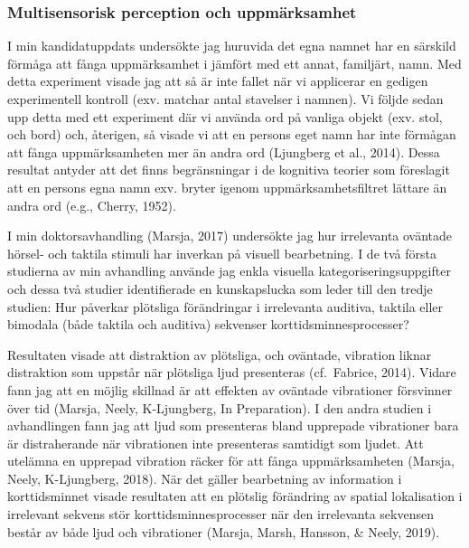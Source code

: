 \documentclass[]{article}
\begin{document}
\hypertarget{multisensorisk-perception-och-uppmuxe4rksamhet}{%
\subsubsection{Multisensorisk perception och
uppmärksamhet}\label{multisensorisk-perception-och-uppmuxe4rksamhet}}

I min kandidatuppdats undersökte jag huruvida det egna namnet har en
särskild förmåga att fånga uppmärksamhet i jämfört med ett annat,
familjärt, namn. Med detta experiment visade jag att så är inte fallet
när vi applicerar en gedigen experimentell kontroll (exv. matchar antal
stavelser i namnen). Vi följde sedan upp detta med ett experiment där vi
använda ord på vanliga objekt (exv. stol, och bord) och, återigen, så
visade vi att en persons eget namn har inte förmågan att fånga
uppmärksamheten mer än andra ord (Ljungberg et al., 2014). Dessa
resultat antyder att det finns begränsningar i de kognitiva teorier som
föreslagit att en persons egna namn exv. bryter igenom
uppmärksamhetsfiltret lättare än andra ord (e.g., Cherry, 1952).

I min doktorsavhandling (Marsja, 2017) undersökte jag hur irrelevanta
oväntade hörsel- och taktila stimuli har inverkan på visuell
bearbetning. I de två första studierna av min avhandling använde jag
enkla visuella kategoriseringsuppgifter och dessa två studier
identifierade en kunskapslucka som leder till den tredje studien: Hur
påverkar plötsliga förändringar i irrelevanta auditiva, taktila eller
bimodala (både taktila och auditiva) sekvenser korttidsminnesprocesser?

Resultaten visade att distraktion av plötsliga, och oväntade, vibration
liknar distraktion som uppstår när plötsliga ljud presenteras
(cf.~Fabrice, 2014). Vidare fann jag att en möjlig skillnad är att
effekten av oväntade vibrationer försvinner över tid (Marsja, Neely,
K-Ljungberg, In Preparation). I den andra studien i avhandlingen fann
jag att ljud som presenteras bland upprepade vibrationer bara är
distraherande när vibrationen inte presenteras samtidigt som ljudet. Att
utelämna en upprepad vibration räcker för att fånga uppmärksamheten
(Marsja, Neely, K-Ljungberg, 2018). När det gäller bearbetning av
information i korttidsminnet visade resultaten att en plötslig
förändring av spatial lokalisation i irrelevant sekvens stör
korttidsminnesprocesser när den irrelevanta sekvensen består av både
ljud och vibrationer (Marsja, Marsh, Hansson, \& Neely, 2019).
\end{document}
